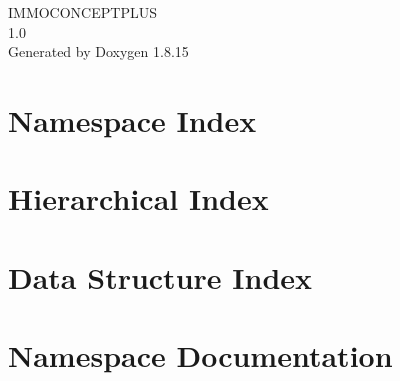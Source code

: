 \let\mypdfximage\pdfximage\def\pdfximage{\immediate\mypdfximage}\documentclass[twoside]{book}
\newcommand{\+}{\discretionary{\mbox{\scriptsize$\hookleftarrow$}}{}{}}
\newcommand{\clearemptydoublepage}{%
  \newpage{\pagestyle{empty}\cleardoublepage}%
}
\begin{document}
\hypersetup{pageanchor=false,
             bookmarksnumbered=true,
             pdfencoding=unicode
            }
\begin{titlepage}
\vspace*{7cm}
\begin{center}%
{\Large I\+M\+M\+O\+C\+O\+N\+C\+E\+P\+T\+P\+L\+US \\[1ex]\large 1.\+0 }\\
\vspace*{1cm}
{\large Generated by Doxygen 1.8.15}\\
\end{center}
\end{titlepage}
\clearemptydoublepage
{}
\tableofcontents
\clearemptydoublepage
{}
\hypersetup{pageanchor=true}

\chapter{Namespace Index}

\chapter{Hierarchical Index}

\chapter{Data Structure Index}

\chapter{Namespace Documentation}





\end{document}
